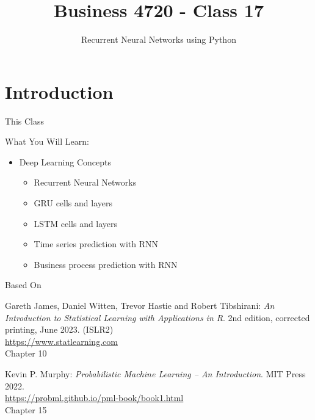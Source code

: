 \documentclass[ignorenonframetext,xcolor=x11names]{beamer}
\title{Business 4720 - Class 17}
\subtitle{Recurrent Neural Networks using Python}
\begin{document}
\begin{frame}{}
  \titlepage
  \footnotesize
  
\end{frame}

\section{Introduction}

\begin{frame}{This Class}

\begin{block}{What You Will Learn:}
\begin{itemize}
  \item Deep Learning Concepts
  \begin{itemize}
     \item Recurrent Neural Networks
     \item GRU cells and layers
     \item LSTM cells and layers
     \item Time series prediction with RNN
     \item Business process prediction with RNN
  \end{itemize}
\end{itemize}
\end{block}
\end{frame}

\begin{frame}{Based On}
\begin{block}{}
Gareth James, Daniel Witten, Trevor Hastie and Robert Tibshirani: \emph{An Introduction to Statistical Learning with Applications in R}. 2nd edition, corrected printing, June 2023. (ISLR2) \\
\vspace{0.5\baselineskip}
\url{https://www.statlearning.com} \\
\vspace{0.5\baselineskip}
Chapter 10
\end{block}

\begin{block}{}
Kevin P. Murphy: \emph{Probabilistic Machine Learning -- An Introduction}. MIT Press 2022. \\
\vspace{0.5\baselineskip}
\url{https://probml.github.io/pml-book/book1.html} \\
\vspace{0.5\baselineskip}
Chapter 15
\end{block}
\end{frame}
\end{document}
